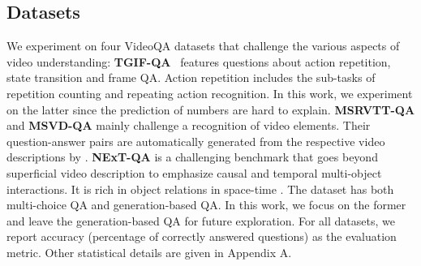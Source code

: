 \documentclass[letterpaper]{article} \usepackage{aaai21}  \usepackage{times}  \usepackage{helvet} \usepackage{courier}  \usepackage[hyphens]{url}  \usepackage{graphicx} \urlstyle{rm} \def\UrlFont{\rm}  \usepackage{natbib}  \usepackage{caption} \usepackage{color, colortbl}
\begin{document}
\subsection{Datasets}
We experiment on four VideoQA datasets that challenge the various aspects of video understanding:
\textbf{TGIF-QA}~\cite{jang2019video} features questions about action repetition, state transition and frame QA. Action repetition includes the sub-tasks of repetition counting and repeating action recognition. In this work, we experiment on the latter since the prediction of numbers are hard to explain. 
\textbf{MSRVTT-QA} and \textbf{MSVD-QA} mainly challenge a recognition of video elements. Their question-answer pairs are automatically generated from the respective video descriptions by \cite{xu2017video}. \textbf{NExT-QA} \cite{xiao2021next} is a challenging benchmark that goes beyond superficial video description to emphasize causal and temporal multi-object interactions. It is rich in object relations in space-time \cite{shang2019annotating}. The dataset has both multi-choice QA and generation-based QA. In this work, we focus on the former and leave the generation-based QA for future exploration. For all datasets, we report accuracy (percentage of correctly answered questions) as the evaluation metric. Other statistical details are given in Appendix A.

\setlength{\belowcaptionskip}{-0.2cm}
\begin{table*}[t!]
\small
\centering
\begin{threeparttable}
\caption{Comparison of accuracy. The best and second-best results are highlighted in bold and underline respectively.}
\label{table:next_result}
\end{threeparttable}
\vspace{-1.0em}
\end{table*}
\end{document}
